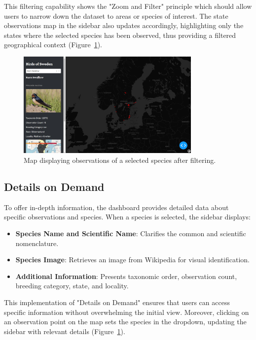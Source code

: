 This filtering capability shows the "Zoom and Filter" principle which should allow users to narrow down the dataset to areas or species of interest. The state observations map in the sidebar also updates accordingly, highlighting only the states where the selected species has been observed, thus providing a filtered geographical context (Figure~\ref{fig:filtered_map}).

\begin{figure}[h] 
    \centering 
    \includegraphics[width=0.8\textwidth]{figures/species_details.jpg} 
    \caption{Map displaying observations of a selected species after filtering.} 
    \label{fig:filtered_map} 
\end{figure}

\subsection{Details on Demand}

To offer in-depth information, the dashboard provides detailed data about specific observations and species. When a species is selected, the sidebar displays:

\begin{itemize}
    \item \textbf{Species Name and Scientific Name}: Clarifies the common and scientific nomenclature. 
    \item \textbf{Species Image}: Retrieves an image from Wikipedia for visual identification. 
    \item \textbf{Additional Information}: Presents taxonomic order, observation count, breeding category, state, and locality. 
\end{itemize}

This implementation of "Details on Demand" ensures that users can access specific information without overwhelming the initial view. Moreover, clicking on an observation point on the map sets the species in the dropdown, updating the sidebar with relevant details (Figure~\ref{fig:filtered_map}).

